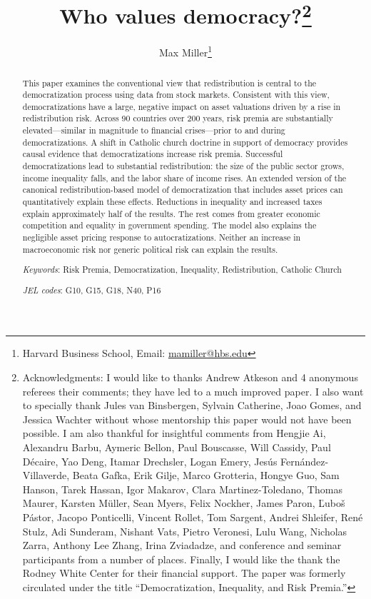 \documentclass[12pt]{article}
\title{Who values democracy?\thanks{Acknowledgments: I would like to thanks Andrew Atkeson and 4 anonymous referees their comments; they have led to a much improved paper.  I also want to specially thank Jules van Binsbergen, Sylvain Catherine, Joao Gomes, and Jessica Wachter without whose mentorship this paper would not have been possible. I am also thankful for insightful comments from Hengjie Ai, Alexandru Barbu, Aymeric Bellon, Paul Bouscasse, Will Cassidy, Paul D\'{e}caire, Yao Deng,  Itamar Drechsler, Logan Emery, Jes\'{u}s Fern\'{a}ndez-Villaverde,  Beata Gafka, Erik Gilje,  Marco Grotteria, Hongye Guo, Sam Hanson, Tarek Hassan, Igor Makarov, Clara Martinez-Toledano, Thomas Maurer, Karsten M\"{u}ller, Sean Myers, Felix Nockher, James Paron, \v{L}ubo\v{s} P\'{a}stor,  Jacopo Ponticelli, Vincent Rollet, Tom Sargent, Andrei Shleifer, Ren\'{e} Stulz, Adi Sunderam, Nishant Vats, Pietro Veronesi, Lulu Wang, Nicholas Zarra, Anthony Lee Zhang, Irina Zviadadze, and conference and seminar participants from a number of places. Finally, I would like the thank the Rodney White Center for their financial support. The paper was formerly circulated under the title ``Democratization, Inequality, and Risk Premia.''}}
\author{Max Miller\thanks{Harvard Business School, Email: \href{mailto:mamiller@hbs.edu}{mamiller@hbs.edu}}	
}
\numberwithin{equation}{section}
\begin{document}
\hypersetup{linkcolor=blue}
\maketitle

\thispagestyle{empty}

	 \vspace{-1cm}

\begin{abstract}

\noindent This paper examines the conventional view that redistribution is central to the democratization process using data from stock markets. Consistent with this view,  democratizations have a large, negative impact on asset valuations driven by a rise in redistribution risk. Across 90 countries over 200 years, risk premia are substantially elevated---similar in magnitude to financial crises---prior to and during democratizations. A shift in Catholic church doctrine in support of democracy provides causal evidence that democratizations increase risk premia. Successful democratizations lead to substantial redistribution: the size of the public sector grows, income inequality falls, and the labor share of income rises.  An extended version of the canonical redistribution-based model of democratization that includes asset prices can quantitatively explain these effects. Reductions in inequality and increased taxes explain approximately half of the results. The rest comes from greater economic competition and equality in government spending. The model also explains the negligible asset pricing response to autocratizations. Neither an increase in macroeconomic risk nor generic political risk can explain the results.

	\vspace{1cm}
	
	\noindent \textit{Keywords}: Risk Premia, Democratization, Inequality, Redistribution, Catholic Church
	
	\noindent \textit{JEL codes}: G10, G15, G18, N40, P16
	
\end{abstract}

\renewcommand{\baselinestretch}{1.3}\normalsize
\newpage
\clearpage
{}

\newpage









\renewcommand{\baselinestretch}{1}\normalsize
\footnotesize
\setlength{\bibsep}{1pt}


\end{document}
